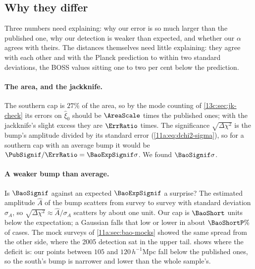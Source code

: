 \subsection{Why they differ}
\label{13c:sec:repro-why}

Three numbers need explaining: why our error is so much larger than the published one,
why our detection is weaker than expected, and whether our $\alpha$ agrees with
theirs. The distances themselves need little explaining: they agree with each other and
with the Planck prediction to within two standard deviations, the BOSS values sitting
one to two per cent below the prediction.

\paragraph{The area, and the jackknife.} The southern cap is $27\%$ of the area, so by
the mode counting of \cref{13c:sec:jk-check} its errors on $\hat\xi_0$ should be
$\AreaScale$ times the published ones; with the jackknife's slight excess they are
$\ErrRatio$ times. The significance $\sqrt{\Delta\chi^2}$ is the bump's amplitude
divided by its standard error (\cref{11a:eq:dchi2-sigma}), so for a southern cap
with an average bump it would be $\PubSignif/\ErrRatio=\BaoExpSignif\sigma$. We
found $\BaoSignif\sigma$.

\paragraph{A weaker bump than average.} Is $\BaoSignif$ against an expected
$\BaoExpSignif$ a surprise? The estimated amplitude $\hat A$ of the bump scatters from
survey to survey with standard deviation $\sigma_A$, so $\sqrt{\Delta\chi^2}\approx\hat
A/\sigma_A$ scatters by about one unit. Our cap is $\BaoShort$ units below the
expectation; a Gaussian falls that low or lower in about $\BaoShortP\%$ of cases. The
mock surveys of \cref{11a:sec:bao-mocks} showed the same spread from the other side,
where the 2005 detection sat in the upper tail.  shows where the
deficit is: our points between $105$ and $120\,h^{-1}$Mpc fall below the published
ones, so the south's bump is narrower and lower than the whole sample's.

